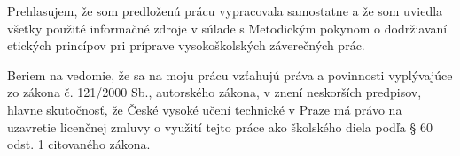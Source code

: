 \documentclass[slovak,master,unicode,oneside,bw]{ctufit-thesis}
\theoremstyle{plain}
\theoremstyle{definition}
\theoremstyle{remark}
\numberwithin{theorem}{chapter}
\begin{document}
\begin{declarationpage}

Prehlasujem, že som predloženú prácu vypracovala samostatne a že som uviedla všetky použité informačné zdroje v súlade s Metodickým pokynom o dodržiavaní etických princípov pri príprave vysokoškolských záverečných prác. 

Beriem na vedomie, že sa na moju prácu vzťahujú práva a povinnosti vyplývajúce zo zákona č. 121/2000 Sb., autorského zákona, v znení neskorších predpisov, hlavne skutočnosť, že České vysoké učení technické v Praze má právo na uzavretie licenčnej zmluvy o využití tejto práce ako školského diela podľa § 60 odst. 1 citovaného zákona.

\end{declarationpage}

\printabstractpage %

% 
% 
% 
% 
% 
% 
% 
% 
% 
\end{document}
